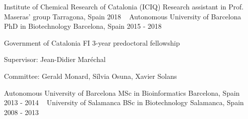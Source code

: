 


\begin{cventries}

  \cventry
    {Institute of Chemical Research of Catalonia (ICIQ)} %
    {Research assistant in Prof. Maseras' group} %
    {Tarragona, Spain} %
    {2018} %
    {~}
  \cventry
    {Autonomous University of Barcelona} %
    {PhD in Biotechnology} %
    {Barcelona, Spain} %
    {2015 - 2018} %
    {
      \begin{cvitems} %
        \item {Government of Catalonia FI 3-year predoctoral fellowship}
        \item {Supervisor: Jean-Didier Maréchal}
        \item {Committee: Gerald Monard, Sílvia Osuna, Xavier Solans\\}
      \end{cvitems}
    }
  \cventry
    {Autonomous University of Barcelona} %
    {MSc in Bioinformatics} %
    {Barcelona, Spain} %
    {2013 - 2014} %
    {~}
  \cventry
    {University of Salamanca} %
    {BSc in Biotechnology} %
    {Salamanca, Spain} %
    {2008 - 2013} %
    {~}

\end{cventries}
